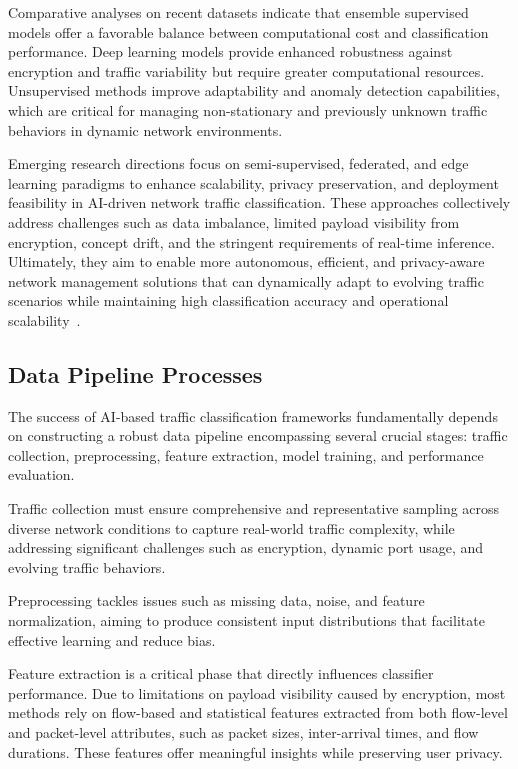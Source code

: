 \documentclass[sigconf]{acmart}
\begin{document}
Comparative analyses on recent datasets indicate that ensemble supervised models offer a favorable balance between computational cost and classification performance. Deep learning models provide enhanced robustness against encryption and traffic variability but require greater computational resources. Unsupervised methods improve adaptability and anomaly detection capabilities, which are critical for managing non-stationary and previously unknown traffic behaviors in dynamic network environments.

Emerging research directions focus on semi-supervised, federated, and edge learning paradigms to enhance scalability, privacy preservation, and deployment feasibility in AI-driven network traffic classification. These approaches collectively address challenges such as data imbalance, limited payload visibility from encryption, concept drift, and the stringent requirements of real-time inference. Ultimately, they aim to enable more autonomous, efficient, and privacy-aware network management solutions that can dynamically adapt to evolving traffic scenarios while maintaining high classification accuracy and operational scalability~\cite{ref51}.

\subsection{Data Pipeline Processes}

The success of AI-based traffic classification frameworks fundamentally depends on constructing a robust data pipeline encompassing several crucial stages: traffic collection, preprocessing, feature extraction, model training, and performance evaluation.

Traffic collection must ensure comprehensive and representative sampling across diverse network conditions to capture real-world traffic complexity, while addressing significant challenges such as encryption, dynamic port usage, and evolving traffic behaviors.

Preprocessing tackles issues such as missing data, noise, and feature normalization, aiming to produce consistent input distributions that facilitate effective learning and reduce bias.

Feature extraction is a critical phase that directly influences classifier performance. Due to limitations on payload visibility caused by encryption, most methods rely on flow-based and statistical features extracted from both flow-level and packet-level attributes, such as packet sizes, inter-arrival times, and flow durations. These features offer meaningful insights while preserving user privacy.
\end{document}
